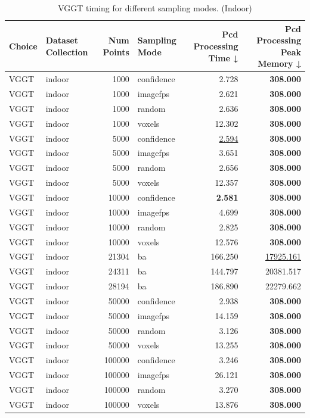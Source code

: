 \begin{table}[H]
\caption{\ifdefined\customcaption \customcaption \else VGGT timing for different sampling modes. (Indoor) \fi}
\label{tab:01_sampling_mode_timing_indoor}
\centering
\scriptsize
\begin{tabular}{llrlrr}
\toprule
Choice & Dataset Collection & Num Points & Sampling Mode & Pcd Processing Time ↓ & Pcd Processing Peak Memory ↓ \\
\midrule
VGGT & indoor & 1000 & confidence & 2.728 & \textbf{308.000} \\
VGGT & indoor & 1000 & imagefps & 2.621 & \textbf{308.000} \\
VGGT & indoor & 1000 & random & 2.636 & \textbf{308.000} \\
VGGT & indoor & 1000 & voxels & 12.302 & \textbf{308.000} \\
VGGT & indoor & 5000 & confidence & \underline{2.594} & \textbf{308.000} \\
VGGT & indoor & 5000 & imagefps & 3.651 & \textbf{308.000} \\
VGGT & indoor & 5000 & random & 2.656 & \textbf{308.000} \\
VGGT & indoor & 5000 & voxels & 12.357 & \textbf{308.000} \\
VGGT & indoor & 10000 & confidence & \textbf{2.581} & \textbf{308.000} \\
VGGT & indoor & 10000 & imagefps & 4.699 & \textbf{308.000} \\
VGGT & indoor & 10000 & random & 2.825 & \textbf{308.000} \\
VGGT & indoor & 10000 & voxels & 12.576 & \textbf{308.000} \\
VGGT & indoor & 21304 & ba & 166.250 & \underline{17925.161} \\
VGGT & indoor & 24311 & ba & 144.797 & 20381.517 \\
VGGT & indoor & 28194 & ba & 186.890 & 22279.662 \\
VGGT & indoor & 50000 & confidence & 2.938 & \textbf{308.000} \\
VGGT & indoor & 50000 & imagefps & 14.159 & \textbf{308.000} \\
VGGT & indoor & 50000 & random & 3.126 & \textbf{308.000} \\
VGGT & indoor & 50000 & voxels & 13.255 & \textbf{308.000} \\
VGGT & indoor & 100000 & confidence & 3.246 & \textbf{308.000} \\
VGGT & indoor & 100000 & imagefps & 26.121 & \textbf{308.000} \\
VGGT & indoor & 100000 & random & 3.270 & \textbf{308.000} \\
VGGT & indoor & 100000 & voxels & 13.876 & \textbf{308.000} \\
\bottomrule
\end{tabular}
\end{table}